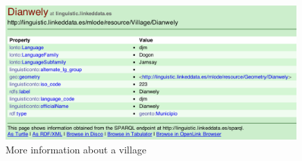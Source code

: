 \begin{figure}[htb!p]
\centering
\includegraphics[width=0.99\textwidth]{img/more_information.png}
\caption{More information about a village}
\label{more_information.png}
\end{figure}

